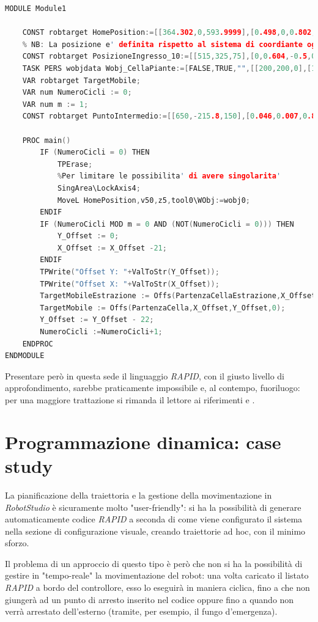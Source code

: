 \begin{lstlisting}[language=C++,style=Matlab-editor,caption=Esempio di programmazione \emph{RAPID},captionpos=b,label={Code:ExampleRAPID}, basicstyle=\scriptsize\ttfamily,frame=trBL]
MODULE Module1

	CONST robtarget HomePosition:=[[364.302,0,593.9999],[0.498,0,0.802,0],[0,0,0,0],[9E+09,9E+09,9E+09,9E+09,9E+09,9E+09]];
	% NB: La posizione e' definita rispetto al sistema di coordiante oggetto corrente
	CONST robtarget PosizioneIngresso_10:=[[515,325,75],[0,0.604,-0.5,0],[0,0,0,0],[9E+09,9E+09,9E+09,9E+09,9E+09,9E+09]];
	TASK PERS wobjdata Wobj_CellaPiante:=[FALSE,TRUE,"",[[200,200,0],[1,0,0,0]],[[0,0,0],[1,0,0,0]]]; 
	VAR robtarget TargetMobile;
	VAR num NumeroCicli := 0;
	VAR num m := 1;
	CONST robtarget PuntoIntermedio:=[[650,-215.8,150],[0.046,0.007,0.882,-0.002],[0,0,0,0],[9E+09,9E+09,9E+09,9E+09,9E+09,9E+09]];

	PROC main()
		IF (NumeroCicli = 0) THEN
			TPErase;
			%Per limitare le possibilita' di avere singolarita'
			SingArea\LockAxis4;
			MoveL HomePosition,v50,z5,tool0\WObj:=wobj0;
		ENDIF
		IF (NumeroCicli MOD m = 0 AND (NOT(NumeroCicli = 0))) THEN
			Y_Offset := 0;
			X_Offset := X_Offset -21;
		ENDIF
		TPWrite("Offset Y: "+ValToStr(Y_Offset));
		TPWrite("Offset X: "+ValToStr(X_Offset));
		TargetMobileEstrazione := Offs(PartenzaCellaEstrazione,X_Offset,Y_Offset,0);
		TargetMobile := Offs(PartenzaCella,X_Offset,Y_Offset,0);
		Y_Offset := Y_Offset - 22;
		NumeroCicli :=NumeroCicli+1;
	ENDPROC
ENDMODULE
\end{lstlisting}

Presentare però in questa sede il linguaggio \emph{RAPID}, con il giusto livello di approfondimento, sarebbe praticamente impossibile e, al contempo, fuoriluogo: per una maggiore trattazione si rimanda il lettore ai riferimenti \cite{ABB:Manul_RAPID} e \cite{ABB:CompleteManul_RAPID}.

\chapter{Programmazione dinamica: case study}
\label{subsec:ROS}
La pianificazione della traiettoria e la gestione della movimentazione in \emph{RobotStudio} è sicuramente molto "user-friendly": si ha la possibilità di generare automaticamente codice \emph{RAPID} a seconda di come viene configurato il sistema nella sezione di configurazione visuale, creando traiettorie ad hoc, con il minimo sforzo.

Il problema di un approccio di questo tipo è però che non si ha la possibilità di gestire in "tempo-reale" la movimentazione del robot: una volta caricato il listato \emph{RAPID} a bordo del controllore, esso lo eseguirà in maniera ciclica, fino a che non giungerà ad un punto di arresto inserito nel codice oppure fino a quando non verrà arrestato dell'esterno (tramite, per esempio, il fungo d'emergenza).

